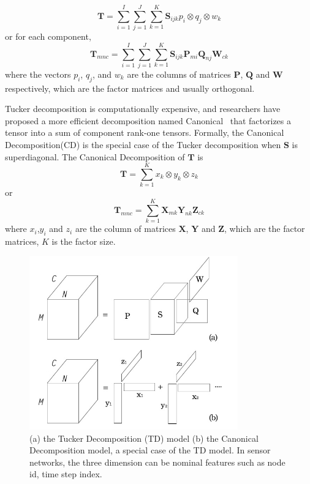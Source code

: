 \begin{equation*}
\mathbf{T}=\sum\limits_{i=1}^{I}\sum\limits_{j=1}^{J}\sum\limits_{k=1}^{K}\mathbf{S}_{ijk}p_i\otimes q_j\otimes w_k
\end{equation*}
or for each component,
\begin{equation*}
\mathbf{T}_{mnc}=\sum\limits_{i=1}^{I}\sum\limits_{j=1}^{J}\sum\limits_{k=1}^{K}\mathbf{S}_{ijk}\mathbf{P}_{m i}\mathbf{Q}_{n j}\mathbf{W}_{c k}
\end{equation*}
where the vectors $p_i$, $q_j$, and $w_k$ are the columns of matrices $\mathbf{P}$, $\mathbf{Q}$ and $\mathbf{W}$ respectively, which are the factor matrices and usually orthogonal.


Tucker decomposition is computationally expensive, and researchers have proposed a more efficient decomposition named Canonical ~\cite{carrol1970CD}that factorizes a tensor into a sum of component rank-one tensors.
Formally, the Canonical Decomposition(CD) is the special case of the Tucker decomposition when $\mathbf{S}$ is superdiagonal.
The Canonical Decomposition of $\mathbf{T}$ is
\begin{equation*}
\mathbf{T}=\sum\limits_{k=1}^{K}x_k\otimes y_k\otimes z_k
\end{equation*}
or
\begin{equation*}
\mathbf{T}_{mnc}=\sum\limits_{k=1}^{K}\mathbf{X}_{m k} \mathbf{Y}_{n k} \mathbf{Z}_{c k}
\end{equation*}
where $x_i$,$y_i$ and $z_i$ are the column of matrices $\mathbf{X}$, $\mathbf{Y}$ and $\mathbf{Z}$, which are the factor matrices, $K$ is the factor size. 

\begin{figure}[h] 
\includegraphics[width=9cm]{tf.jpg} 
\caption{ (a) the Tucker Decomposition (TD) model (b) the Canonical Decomposition model, a special case of the TD model. In sensor networks, the three dimension can be nominal features such as node id, time step index.} 
\label{fig:tf:tuckcanon} 
\end{figure}

